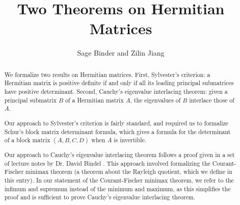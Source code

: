 \documentclass[11pt,a4paper]{article}
\begin{document}
\title{Two Theorems on Hermitian Matrices}
\author{Sage Binder and Zilin Jiang}
\maketitle

\begin{abstract}
    We formalize two results on Hermitian matrices.
    First, Sylvester's criterion: a Hermitian matrix
    is positive definite if and only if all its leading principal submatrices
    have positive determinant.
    Second, Cauchy's eigenvalue interlacing theorem:
    given a principal submatrix $B$ of a Hermitian matrix $A$,
    the eigenvalues of $B$ interlace those of $A$.

    Our approach to Sylvester's criterion is fairly standard,
    and required us to formalize Schur's block matrix determinant formula,
    which gives a formula for the determinant of a block matrix $(A, B, C, D)$
    when $A$ is invertible.

    Our approach to Cauchy's eigenvalue interlacing theorem
    follows a proof given in a set of lecture notes by Dr. David Bindel \cite{bindel2019lecture}.
    This approach involved formalizing the Courant-Fischer minimax theorem
    (a theorem about the Rayleigh quotient, which we define in this entry).
    In our statement of the Courant-Fischer minimax theorem,
    we refer to the infimum and supremum instead of the minimum and maximum,
    as this simplifies the proof and is sufficient to prove Cauchy's eigenvalue interlacing theorem.
\end{abstract}

\tableofcontents





\end{document}
